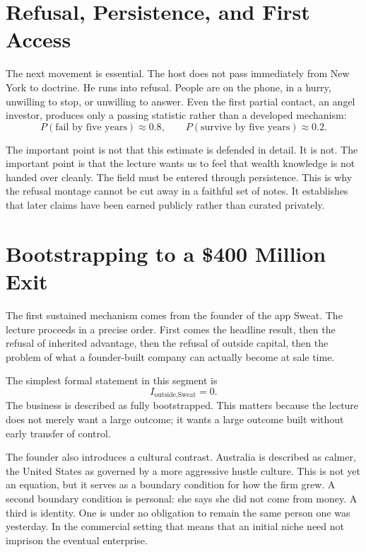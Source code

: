 \section{Refusal, Persistence, and First Access}

The next movement is essential. The host does not pass immediately from New York to doctrine. He runs into refusal. People are on the phone, in a hurry, unwilling to stop, or unwilling to answer. Even the first partial contact, an angel investor, produces only a passing statistic rather than a developed mechanism:
\begin{equation}
P(\text{fail by five years})\approx 0.8,\qquad
P(\text{survive by five years})\approx 0.2.
\end{equation}

The important point is not that this estimate is defended in detail. It is not. The important point is that the lecture wants us to feel that wealth knowledge is not handed over cleanly. The field must be entered through persistence. This is why the refusal montage cannot be cut away in a faithful set of notes. It establishes that later claims have been earned publicly rather than curated privately.

\section{Bootstrapping to a \$400 Million Exit}

The first sustained mechanism comes from the founder of the app Sweat. The lecture proceeds in a precise order. First comes the headline result, then the refusal of inherited advantage, then the refusal of outside capital, then the problem of what a founder-built company can actually become at sale time.

The simplest formal statement in this segment is
\begin{equation}
I_{\text{outside,Sweat}}=0.
\end{equation}
The business is described as fully bootstrapped. This matters because the lecture does not merely want a large outcome; it wants a large outcome built without early transfer of control.

The founder also introduces a cultural contrast. Australia is described as calmer, the United States as governed by a more aggressive hustle culture. This is not yet an equation, but it serves as a boundary condition for how the firm grew. A second boundary condition is personal: she says she did not come from money. A third is identity. One is under no obligation to remain the same person one was yesterday. In the commercial setting that means that an initial niche need not imprison the eventual enterprise.

